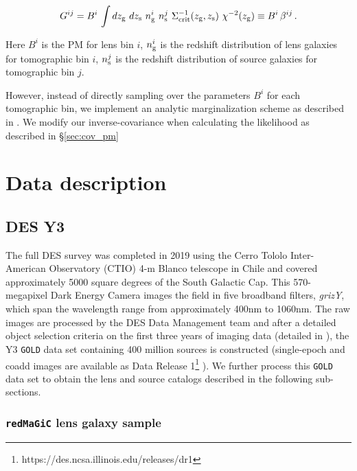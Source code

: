 \documentclass[aps, prd,twocolumn,superscriptaddress,nofootinbib,preprintnumbers]{revtex4-1}
\newcommand{\redmagic}{\texttt{redMaGiC} }
\newcommand{\gold}{\texttt{GOLD} }
\begin{document}
\begin{linenomath*}
\begin{equation}\label{eq:pm_Cij}
    G^{ij} = B^i \, \int dz_{\rm g} \ dz_{\rm s} \ n^{i}_{{\rm g}} \ n^{j}_{{\rm s}} \ \Sigma^{-1}_{\rm crit}(z_{\rm g},z_{\rm s}) \ \chi^{-2}(z_{\rm g}) \equiv B^i \, \beta^{ij} \,.
\end{equation}
\end{linenomath*}
Here $B^i$ is the PM for lens bin $i$, $n^{i}_{{\rm g}}$ is the redshift distribution of lens galaxies for tomographic bin $i$, $n^{j}_{{\rm s}}$ is the redshift distribution of source galaxies for tomographic bin $j$. 

However, instead of directly sampling over the parameters $B^i$ for each tomographic bin, we implement an analytic marginalization scheme as described in \cite{MacCrann:2019ntb}. We modify our inverse-covariance when calculating the likelihood as described in \S\ref{sec:cov_pm}

    

\section{Data description}

\subsection{DES Y3}

The full DES survey was completed in 2019 using the Cerro Tololo Inter-American Observatory (CTIO) 4-m Blanco telescope in Chile and covered approximately 5000 square degrees of the South Galactic Cap. This 570-megapixel Dark Energy Camera \citep{Flaugher15} images the field in five broadband filters, \textit{grizY}, which span the wavelength range from approximately 400nm to 1060nm. The raw images are processed by the DES Data Management team \citep{Sevilla11, Morganson18} and after a detailed object selection criteria on the first three years of imaging data (detailed in \citealt{Abbott_2018}), the Y3 \gold data set containing 400 million sources is constructed (single-epoch and coadd images are available as Data Release 1\footnote{https://des.ncsa.illinois.edu/releases/dr1} ). We further process this \gold data set to obtain the lens and source catalogs described in the following sub-sections.


\subsubsection{\redmagic lens galaxy sample}
\end{document}
